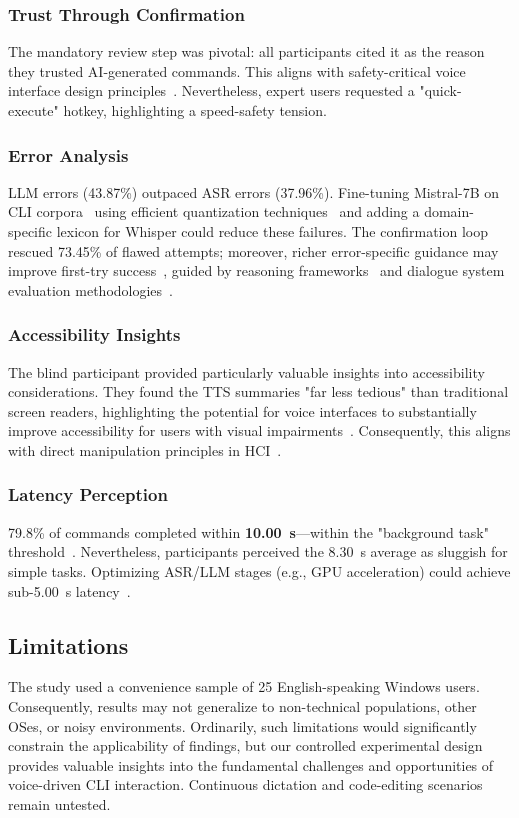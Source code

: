 \documentclass[a4paper,12pt]{article}
\begin{document}
\subsubsection*{Trust Through Confirmation}  
The mandatory review step was pivotal: all participants cited it as the reason they trusted AI-generated commands. This aligns with safety-critical voice interface design principles~\cite{ref12}. Nevertheless, expert users requested a "quick-execute" hotkey, highlighting a speed-safety tension.  

\subsubsection*{Error Analysis}  
LLM errors (43.87\%) outpaced ASR errors (37.96\%). Fine-tuning Mistral-7B on CLI corpora~\cite{ref5} using efficient quantization techniques~\cite{ref24} and adding a domain-specific lexicon for Whisper could reduce these failures. The confirmation loop rescued 73.45\% of flawed attempts; moreover, richer error-specific guidance may improve first-try success~\cite{ref4}, guided by reasoning frameworks~\cite{ref19} and dialogue system evaluation methodologies~\cite{ref18}.

\subsubsection*{Accessibility Insights}  
The blind participant provided particularly valuable insights into accessibility considerations. They found the TTS summaries "far less tedious" than traditional screen readers, highlighting the potential for voice interfaces to substantially improve accessibility for users with visual impairments~\cite{ref28}. Consequently, this aligns with direct manipulation principles in HCI~\cite{ref21}.  

\subsubsection*{Latency Perception}  
79.8\% of commands completed within \textbf{10.00~s}—within the "background task" threshold~\cite{ref4}. Nevertheless, participants perceived the 8.30~s average as sluggish for simple tasks. Optimizing ASR/LLM stages (e.g., GPU acceleration) could achieve sub-5.00~s latency~\cite{ref5}.  

\subsection{Limitations}  
The study used a convenience sample of 25 English-speaking Windows users. Consequently, results may not generalize to non-technical populations, other OSes, or noisy environments. Ordinarily, such limitations would significantly constrain the applicability of findings, but our controlled experimental design provides valuable insights into the fundamental challenges and opportunities of voice-driven CLI interaction. Continuous dictation and code-editing scenarios remain untested.  
\end{document}
